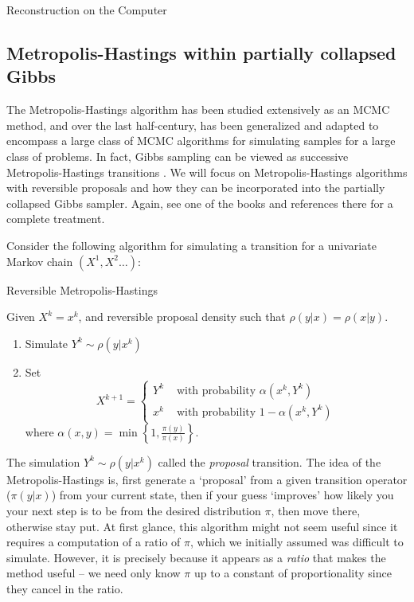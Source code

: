 \begin{chapter}{Reconstruction on the Computer}
\subsection{Metropolis-Hastings within partially collapsed Gibbs}
The Metropolis-Hastings algorithm \citep{metropolis1953equation} has been studied extensively as an MCMC method, and over the last half-century, has been generalized and adapted to encompass a large class of MCMC algorithms for simulating samples for a large class of problems. 
In fact, Gibbs sampling can be viewed as successive Metropolis-Hastings transitions \citep{robert2013monte}.
We will focus on Metropolis-Hastings algorithms with reversible proposals and how they can be incorporated into the partially collapsed Gibbs sampler.
Again, see one of the books \citep{calvetti2007introduction,liu2008monte,robert2013monte} and references there for a complete treatment.

Consider the following algorithm for simulating a transition for a univariate Markov chain $(X^1,X^2\dots)$:
\begin{algorithm}[H]
\caption{Reversible Metropolis-Hastings} \label{alg:metropolis}
Given $X^k = x^{k}$, and reversible proposal density such that $\rho(y|x) = \rho(x|y)$.
\begin{enumerate}[1.]
  \item Simulate $Y^k \sim \rho(y|x^k)$
  \item Set
  \begin{equation*}
    X^{k+1} = \begin{cases}
      Y^k &\text{ with probability } \alpha(x^{k},Y^k) \\
      x^k &\text{ with probability } 1-\alpha(x^{k},Y^k)
    \end{cases} 
  \end{equation*}
  where $\displaystyle{\alpha(x,y) = \min\left\{1,\frac{\pi(y)}{\pi(x)}\right\}.}$ 
\end{enumerate}
\end{algorithm} 

The simulation $Y^k\sim \rho(y|x^k)$ called the \emph{proposal} transition.
The idea of the Metropolis-Hastings is, first generate a `proposal' from a given transition operator ($\pi(y|x)$) from your current state, then if your guess `improves' how likely you your next step is to be from the desired distribution $\pi$, then move there, otherwise stay put.
At first glance, this algorithm might not seem useful since it requires a computation of a ratio of $\pi$, which we initially assumed was difficult to simulate.
However, it is precisely because it appears as a \emph{ratio} that makes the method useful -- we need only know $\pi$ up to a constant of proportionality since they cancel in the ratio.


\end{chapter}
